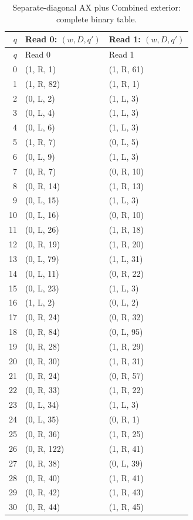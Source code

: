 \small
\begin{longtable}{rll}
\caption{Separate-diagonal AX plus Combined exterior: complete binary table.}\\
\toprule $q$ & Read 0: $(w,D,q')$ & Read 1: $(w,D,q')$ \\ \midrule
\endfirsthead
\toprule $q$ & Read 0 & Read 1 \\ \midrule
\endhead
0 & (1, R, 1) & (1, R, 61) \\
1 & (1, R, 82) & (1, R, 1) \\
2 & (0, L, 2) & (1, L, 3) \\
3 & (0, L, 4) & (1, L, 3) \\
4 & (0, L, 6) & (1, L, 3) \\
5 & (1, R, 7) & (0, L, 5) \\
6 & (0, L, 9) & (1, L, 3) \\
7 & (0, R, 7) & (0, R, 10) \\
8 & (0, R, 14) & (1, R, 13) \\
9 & (0, L, 15) & (1, L, 3) \\
10 & (0, L, 16) & (0, R, 10) \\
11 & (0, L, 26) & (1, R, 18) \\
12 & (0, R, 19) & (1, R, 20) \\
13 & (0, L, 79) & (1, L, 31) \\
14 & (0, L, 11) & (0, R, 22) \\
15 & (0, L, 23) & (1, L, 3) \\
16 & (1, L, 2) & (0, L, 2) \\
17 & (0, R, 24) & (0, R, 32) \\
18 & (0, R, 84) & (0, L, 95) \\
19 & (0, R, 28) & (1, R, 29) \\
20 & (0, R, 30) & (1, R, 31) \\
21 & (0, R, 24) & (0, R, 57) \\
22 & (0, R, 33) & (1, R, 22) \\
23 & (0, L, 34) & (1, L, 3) \\
24 & (0, L, 35) & (0, R, 1) \\
25 & (0, R, 36) & (1, R, 25) \\
26 & (0, R, 122) & (1, R, 41) \\
27 & (0, R, 38) & (0, L, 39) \\
28 & (0, R, 40) & (1, R, 41) \\
29 & (0, R, 42) & (1, R, 43) \\
30 & (0, R, 44) & (1, R, 45) \\

\end{longtable}
